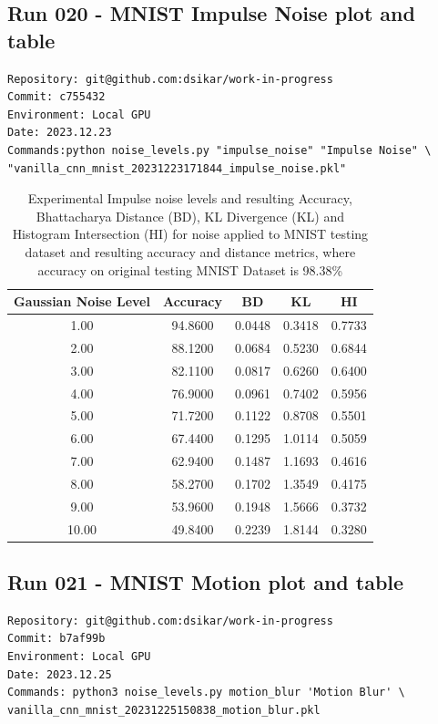 \subsection{Run 020 - MNIST Impulse Noise plot and table}
\label{app_res:020}
\begin{verbatim}
Repository: git@github.com:dsikar/work-in-progress
Commit: c755432
Environment: Local GPU
Date: 2023.12.23
Commands:python noise_levels.py "impulse_noise" "Impulse Noise" \
"vanilla_cnn_mnist_20231223171844_impulse_noise.pkl"
\end{verbatim}

\begin{table}[ht]
\centering
\begin{tabular}{|c|c|c|c|c|}
\hline
Gaussian Noise Level & Accuracy & BD & KL & HI \\
\hline
1.00 & 94.8600 & 0.0448 & 0.3418 & 0.7733 \\
2.00 & 88.1200 & 0.0684 & 0.5230 & 0.6844 \\
3.00 & 82.1100 & 0.0817 & 0.6260 & 0.6400 \\
4.00 & 76.9000 & 0.0961 & 0.7402 & 0.5956 \\
5.00 & 71.7200 & 0.1122 & 0.8708 & 0.5501 \\
6.00 & 67.4400 & 0.1295 & 1.0114 & 0.5059 \\
7.00 & 62.9400 & 0.1487 & 1.1693 & 0.4616 \\
8.00 & 58.2700 & 0.1702 & 1.3549 & 0.4175 \\
9.00 & 53.9600 & 0.1948 & 1.5666 & 0.3732 \\
10.00 & 49.8400 & 0.2239 & 1.8144 & 0.3280 \\
\hline
\end{tabular}
\caption{Experimental Impulse noise levels and resulting Accuracy, Bhattacharya Distance (BD), KL Divergence (KL) and Histogram Intersection (HI) for noise applied to MNIST testing dataset and resulting accuracy and distance metrics, where accuracy on original testing MNIST Dataset is 98.38\%}
\label{tbl-impulse-noise-levels}
\end{table}

\subsection{Run 021 - MNIST Motion plot and table}
\label{app_res:021}
\begin{verbatim}
Repository: git@github.com:dsikar/work-in-progress
Commit: b7af99b
Environment: Local GPU
Date: 2023.12.25
Commands: python3 noise_levels.py motion_blur 'Motion Blur' \
vanilla_cnn_mnist_20231225150838_motion_blur.pkl
\end{verbatim}

